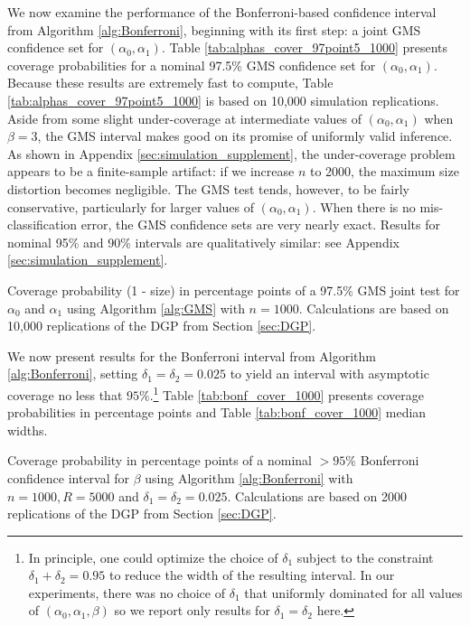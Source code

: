 We now examine the performance of the Bonferroni-based confidence interval from Algorithm \ref{alg:Bonferroni}, beginning with its first step: a joint GMS confidence set for $(\alpha_0, \alpha_1)$.
Table \ref{tab:alphas_cover_97point5_1000} presents coverage probabilities for a nominal 97.5\% GMS confidence set for $(\alpha_0, \alpha_1)$.
Because these results are extremely fast to compute, Table \ref{tab:alphas_cover_97point5_1000} is based on 10,000 simulation replications. 
Aside from some slight under-coverage at intermediate values of $(\alpha_0, \alpha_1)$ when $\beta = 3$, the GMS interval makes good on its promise of uniformly valid inference.
As shown in Appendix \ref{sec:simulation_supplement}, the under-coverage problem appears to be a finite-sample artifact: if we increase $n$ to 2000, the maximum size distortion becomes negligible.
The GMS test tends, however, to be fairly conservative, particularly for larger values of $(\alpha_0, \alpha_1)$.
When there is no mis-classification error, the GMS confidence sets are very nearly exact.
Results for nominal 95\% and 90\% intervals are qualitatively similar: see Appendix \ref{sec:simulation_supplement}.

\begin{table}
  \small
  \centering
  
  \caption{Coverage probability (1 - size) in percentage points of a 97.5\% GMS joint test for $\alpha_0$ and $\alpha_1$ using Algorithm \ref{alg:GMS} with $n = 1000$. Calculations are based on 10,000 replications of the DGP from Section \ref{sec:DGP}.}
  \label{tab:alphas_cover_97point5_1000}
\end{table}

We now present results for the Bonferroni interval from Algorithm \ref{alg:Bonferroni}, setting $\delta_1 = \delta_2 = 0.025$ to yield an interval with asymptotic coverage no less that $95\%$.\footnote{In principle, one could optimize the choice of $\delta_1$ subject to the constraint $\delta_1 + \delta_2 = 0.95$ to reduce the width of the resulting interval. In our experiments, there was no choice of $\delta_1$ that uniformly dominated for all values of $(\alpha_0, \alpha_1, \beta)$ so we report only results for $\delta_1 = \delta_2$ here.}
Table \ref{tab:bonf_cover_1000} presents coverage probabilities in percentage points and Table \ref{tab:bonf_cover_1000} median widths.

\begin{table}[htbp]
  \centering
  \small
  
  \caption{Coverage probability in percentage points of a nominal $>95\%$ Bonferroni confidence interval for $\beta$ using Algorithm \ref{alg:Bonferroni} with $n = 1000, R = 5000$ and $\delta_1 = \delta_2 = 0.025$. Calculations are based on 2000 replications of the DGP from Section \ref{sec:DGP}.}
  \label{tab:bonf_cover_1000}
\end{table}

